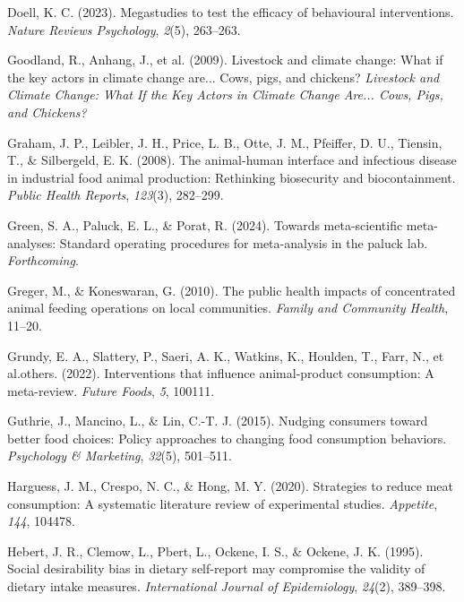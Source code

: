 \documentclass[
  man]{apa6}
\newlength{\cslhangindent}
\newenvironment{CSLReferences}[2] %
 {\begin{list}{}{%
  \setlength{\itemindent}{0pt}
  \setlength{\leftmargin}{0pt}
  \setlength{\parsep}{0pt}
  \ifodd #1
   \setlength{\leftmargin}{\cslhangindent}
   \setlength{\itemindent}{-1\cslhangindent}
  \fi
  \setlength{\itemsep}{#2\baselineskip}}}
 {\end{list}}
\begin{document}
\begin{CSLReferences}{1}{0}
Doell, K. C. (2023). Megastudies to test the efficacy of behavioural interventions. \emph{Nature Reviews Psychology}, \emph{2}(5), 263--263.

Goodland, R., Anhang, J., et al. (2009). Livestock and climate change: What if the key actors in climate change are... Cows, pigs, and chickens? \emph{Livestock and Climate Change: What If the Key Actors in Climate Change Are... Cows, Pigs, and Chickens?}

Graham, J. P., Leibler, J. H., Price, L. B., Otte, J. M., Pfeiffer, D. U., Tiensin, T., \& Silbergeld, E. K. (2008). The animal-human interface and infectious disease in industrial food animal production: Rethinking biosecurity and biocontainment. \emph{Public Health Reports}, \emph{123}(3), 282--299.

Green, S. A., Paluck, E. L., \& Porat, R. (2024). Towards meta-scientific meta-analyses: Standard operating procedures for meta-analysis in the paluck lab. \emph{Forthcoming}.

Greger, M., \& Koneswaran, G. (2010). The public health impacts of concentrated animal feeding operations on local communities. \emph{Family and Community Health}, 11--20.

Grundy, E. A., Slattery, P., Saeri, A. K., Watkins, K., Houlden, T., Farr, N., et al.others. (2022). Interventions that influence animal-product consumption: A meta-review. \emph{Future Foods}, \emph{5}, 100111.

Guthrie, J., Mancino, L., \& Lin, C.-T. J. (2015). Nudging consumers toward better food choices: Policy approaches to changing food consumption behaviors. \emph{Psychology \& Marketing}, \emph{32}(5), 501--511.

Harguess, J. M., Crespo, N. C., \& Hong, M. Y. (2020). Strategies to reduce meat consumption: A systematic literature review of experimental studies. \emph{Appetite}, \emph{144}, 104478.

Hebert, J. R., Clemow, L., Pbert, L., Ockene, I. S., \& Ockene, J. K. (1995). Social desirability bias in dietary self-report may compromise the validity of dietary intake measures. \emph{International Journal of Epidemiology}, \emph{24}(2), 389--398.


\end{CSLReferences}
\end{document}
